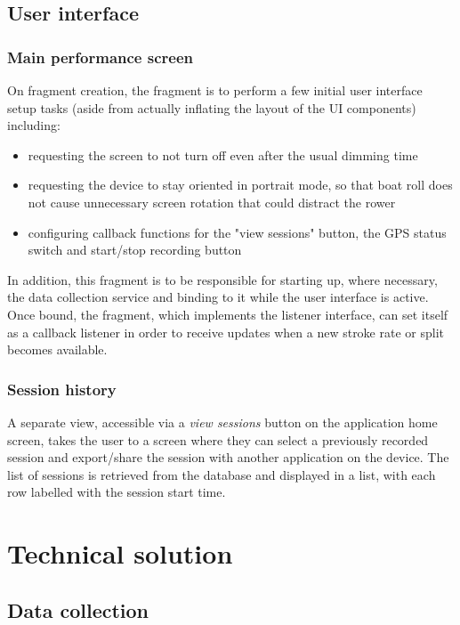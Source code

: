 \documentclass[11pt,twoside,a4paper]{report}
\begin{document}
\section{User interface}

\subsection{Main performance screen}\label{sec:pmfrag}

On fragment creation, the fragment is to perform a few initial user interface setup tasks (aside from actually inflating the layout of the UI components) including:
\begin{itemize}
  \item requesting the screen to not turn off even after the usual dimming time
  \item requesting the device to stay oriented in portrait mode, so that boat roll does not cause unnecessary screen rotation that could distract the rower
  \item configuring callback functions for the "view sessions" button, the GPS status switch and start/stop recording button
\end{itemize}

In addition, this fragment is to be responsible for starting up, where necessary, the data collection service and binding to it while the user interface is active. Once bound, the fragment, which implements the listener interface, can set itself as a callback listener in order to receive updates when a new stroke rate or split becomes available.

\subsection{Session history}

A separate view, accessible via a \textit{view sessions} button on the application home screen, takes the user to a screen where they can select a previously recorded session and export/share the session with another application on the device. The list of sessions is retrieved from the database and displayed in a list, with each row labelled with the session start time.

\chapter{Technical solution}

\section{Data collection}
\end{document}
